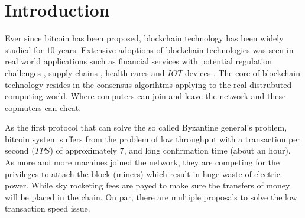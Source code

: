 \section{Introduction}
Ever since bitcoin \cite{nakamoto2008bitcoin} has been proposed, blockchain technology has been widely studied for $10$ years. 
Extensive adoptions of blockchain technologies was seen in real world applications such as 
financial services with potential regulation challenges \cite{michael2018blockchain, tapscott2017blockchain}, 
supply chains \cite{korpela2017digital,tian2016agri, abeyratne2016blockchain}, 
health cares \cite{azaria2016medrec,yue2016healthcare} and $IOT$ devices \cite{christidis2016blockchains}.
The core of blockchain technology resides in the consensus algorihtms applying to the real distrubuted computing world.
Where computers can join and leave the network and these copmuters can cheat.

As the first protocol that can solve the so called Byzantine general's problem, 
bitcoin system suffers from the problem of low throughput with a transaction per second ($TPS$) of approximately $7$, and long confirmation time (about an hour).
As more and more machines joined the network, they are competing for the privileges to attach the block (miners) which result in huge waste of electric power.
While sky rocketing fees are payed to make sure the transfers of money will be placed in the chain.
On par, there are multiple proposals to solve the low transaction speed issue. 

